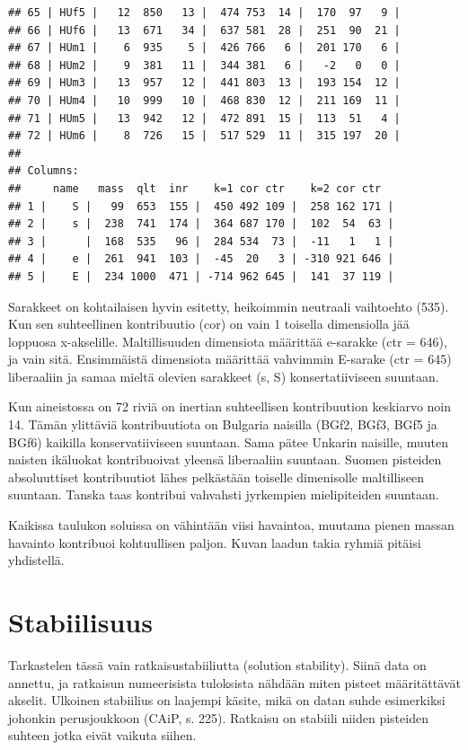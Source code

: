 \documentclass[
  finnish,
]{book}
\begin{document}
\begin{verbatim}
## 65 | HUf5 |   12  850   13 |  474 753  14 |  170  97   9 |
## 66 | HUf6 |   13  671   34 |  637 581  28 |  251  90  21 |
## 67 | HUm1 |    6  935    5 |  426 766   6 |  201 170   6 |
## 68 | HUm2 |    9  381   11 |  344 381   6 |   -2   0   0 |
## 69 | HUm3 |   13  957   12 |  441 803  13 |  193 154  12 |
## 70 | HUm4 |   10  999   10 |  468 830  12 |  211 169  11 |
## 71 | HUm5 |   13  942   12 |  472 891  15 |  113  51   4 |
## 72 | HUm6 |    8  726   15 |  517 529  11 |  315 197  20 |
## 
## Columns:
##     name   mass  qlt  inr    k=1 cor ctr    k=2 cor ctr  
## 1 |    S |   99  653  155 |  450 492 109 |  258 162 171 |
## 2 |    s |  238  741  174 |  364 687 170 |  102  54  63 |
## 3 |      |  168  535   96 |  284 534  73 |  -11   1   1 |
## 4 |    e |  261  941  103 |  -45  20   3 | -310 921 646 |
## 5 |    E |  234 1000  471 | -714 962 645 |  141  37 119 |
\end{verbatim}

Sarakkeet on kohtailaisen hyvin esitetty, heikoimmin neutraali vaihtoehto (535).
Kun sen suhteellinen kontribuutio (cor) on vain 1 toisella dimensiolla jää
loppuosa x-akselille. Maltillisuuden dimensiota määrittää e-sarakke (ctr = 646),
ja vain sitä. Ensimmäistä dimensiota määrittää vahvimmin E-sarake (ctr = 645)
liberaaliin ja samaa mieltä olevien sarakkeet (s, S) konsertatiiviseen suuntaan.

Kun aineistossa on 72 riviä on inertian suhteellisen kontribuution keskiarvo
noin 14. Tämän ylittäviä kontribuutiota on Bulgaria naisilla (BGf2, BGf3, BGf5
ja BGf6) kaikilla konservatiiviseen suuntaan. Sama pätee Unkarin naisille, muuten
naisten ikäluokat kontribuoivat yleensä liberaaliin suuntaan. Suomen pisteiden
absoluuttiset kontribuutiot lähes pelkästään toiselle dimenisolle maltilliseen
suuntaan. Tanska taas kontribui vahvahsti jyrkempien mielipiteiden suuntaan.

Kaikissa taulukon soluissa on vähintään viisi havaintoa, muutama pienen massan
havainto kontribuoi kohtuullisen paljon. Kuvan laadun takia ryhmiä pitäisi
yhdistellä.

\hypertarget{stabiilisuus}{%
\section{Stabiilisuus}\label{stabiilisuus}}

Tarkastelen tässä vain ratkaisustabiiliutta (solution stability). Siinä data on
annettu, ja ratkaisun numeerisista tuloksista nähdään miten pisteet määritättävät
akselit. Ulkoinen stabiilius on laajempi käsite, mikä on datan suhde esimerkiksi
johonkin perusjoukkoon (CAiP, s. 225). Ratkaisu on stabiili niiden pisteiden
suhteen jotka eivät vaikuta siihen.
\end{document}
